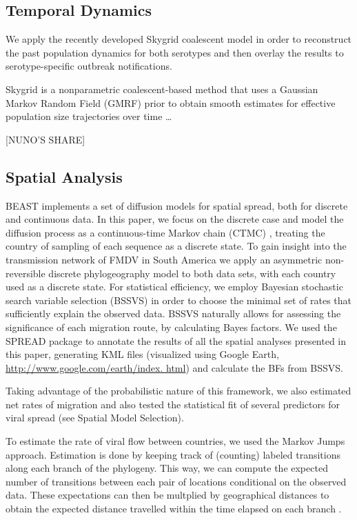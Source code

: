 \documentclass[10pt]{article}
\begin{document}
\subsection*{Temporal Dynamics}

We apply the recently developed Skygrid coalescent model \cite{skygrid} in order to reconstruct the past population dynamics for both serotypes and then overlay the results to serotype-specific outbreak notifications.

Skygrid is a nonparametric coalescent-based method that uses a Gaussian Markov Random Field (GMRF) prior to obtain smooth estimates for effective population size trajectories over time \ldots 
\begin{center}
 [NUNO'S SHARE]
\end{center}


\subsection*{Spatial Analysis}

BEAST \cite{BEAST} implements a set of diffusion models for spatial spread, both for discrete and continuous data.
In this paper, we focus on the discrete case and model the diffusion process as a continuous-time Markov chain (CTMC) \cite{roots}, treating the country of sampling of each sequence as a discrete state.
To gain insight into the transmission network of FMDV in South America we apply an asymmetric non-reversible discrete phylogeography model to both data sets, with each country used as a discrete state.
For statistical efficiency, we employ Bayesian stochastic search variable selection (BSSVS) in order to choose the minimal set of rates that sufficiently explain the observed data.
BSSVS naturally allows for assessing the significance of each migration route, by calculating Bayes factors.
We used the SPREAD \cite{spread} package to annotate the results of all the spatial analyses presented in this paper, generating KML files (visualized using Google Earth, \url{http://www.google.com/earth/index.
html}) and calculate the BFs from BSSVS.

Taking advantage of the probabilistic nature of this framework, we also estimated net rates of migration and also tested the statistical fit of several predictors for viral spread (see Spatial Model Selection).

To estimate the rate of viral flow between countries, we used the Markov Jumps \cite{Minin2008} approach.
Estimation is done by keeping track of (counting) labeled transitions along each branch of the phylogeny.
This way, we can compute the expected number of transitions between each pair of locations conditional on the observed data.
These expectations can then be multplied by geographical distances to obtain the expected distance travelled within the time elapsed on each branch \cite{zoonotic}.
\end{document}

